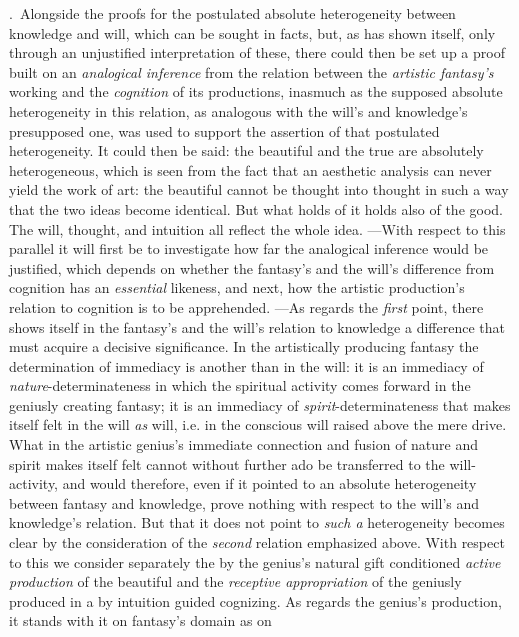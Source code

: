 \documentclass[12pt,a4paper]{book}
\begin{document}
\medskip

.~Alongside the proofs for the postulated absolute heterogeneity between knowledge
and will, which can be sought in facts, but, as has shown itself, only through an unjustified
interpretation of these, there could then be set up a proof built on an \emph{analogical inference}
from the relation between the \emph{artistic fantasy's} working and the \emph{cognition} of its productions,
inasmuch as the supposed absolute heterogeneity in this relation, as analogous with the will's
and knowledge's presupposed one, was used to support the assertion of that postulated
heterogeneity. It could then be said: the beautiful and the true are absolutely heterogeneous,
which is seen from the fact that an aesthetic analysis can never yield the work of art: the
beautiful cannot be thought into thought in such a way that the two ideas become identical. But
what holds of it holds also of the good. The will, thought, and intuition all reflect the whole
idea. ---With respect to this parallel it will first be to investigate how far the analogical
inference would be justified, which depends on whether the fantasy's and the will's difference
from cognition has an \emph{essential} likeness, and next, how the artistic production's relation to
cognition is to be apprehended. ---As regards the \emph{first} point, there shows itself in the
fantasy's and the will's relation to knowledge a difference that must acquire a decisive
significance. In the artistically producing fantasy the determination of immediacy is another
than in the will: it is an immediacy of \emph{nature}-determinateness in which the spiritual activity
comes forward in the geniusly creating fantasy; it is an immediacy of \emph{spirit}-determinateness
that makes itself felt in the will \emph{as} will, i.e. in the conscious will raised above the mere
drive. What in the artistic genius's immediate connection and fusion of nature and spirit makes
itself felt cannot without further ado be transferred to the will-activity, and would therefore,
even if it pointed to an absolute heterogeneity between fantasy and knowledge, prove nothing with
respect to the will's and knowledge's relation. But that it does not point to \emph{such a} heterogeneity
becomes clear by the consideration of the \emph{second} relation emphasized above. With respect to this
we consider separately the by the genius's natural gift conditioned \emph{active production} of the
beautiful and the \emph{receptive appropriation} of the geniusly produced in a by intuition
guided cognizing. As regards the genius's production, it stands with it on fantasy's domain as on
\end{document}
